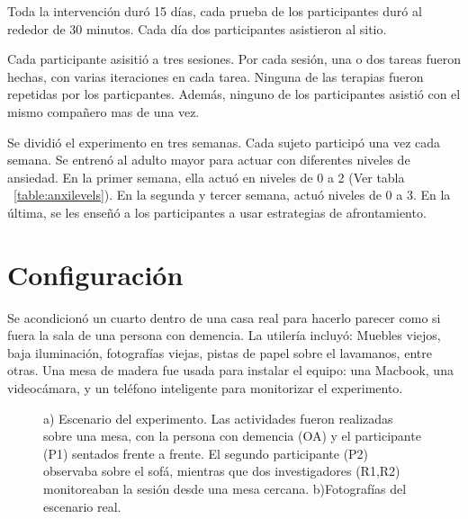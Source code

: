 Toda la intervenci\'on dur\'o 15 d\'ias, cada prueba de los participantes dur\'o al rededor de 30 minutos. Cada d\'ia dos participantes asistieron al sitio.

Cada participante asisiti\'o a tres sesiones. Por cada sesi\'on, una o dos tareas fueron hechas, con varias iteraciones en cada tarea. Ninguna de las terapias fueron repetidas por los particpantes. Adem\'as, ninguno de los participantes asisti\'o con el mismo compa\~nero mas de una vez.

Se dividi\'o el experimento en tres semanas. Cada sujeto particip\'o una vez cada semana. Se entren\'o al adulto mayor para actuar con diferentes niveles de ansiedad. En la primer semana, ella actu\'o en niveles de 0 a 2 (Ver tabla ~\ref{table:anxilevels}). En la segunda y tercer semana, actu\'o niveles de 0 a 3. En la \'ultima, se les ense\~n\'o a los participantes a usar estrategias de afrontamiento.
\section{Configuraci\'on}\label{secc:setup}
	Se acondicion\'o un cuarto dentro de una casa real para hacerlo parecer como si fuera la sala de una persona con demencia. La utiler\'ia incluy\'o: Muebles viejos, baja iluminaci\'on, fotograf\'ias viejas, pistas de papel sobre el lavamanos, entre otras. Una mesa de madera fue usada para instalar el equipo: una Macbook, una videoc\'amara, y un tel\'efono inteligente para monitorizar el experimento.
\begin{figure}[h!]
        \centering
	\caption{a) Escenario del experimento. Las actividades fueron realizadas sobre una mesa, con la persona con demencia (OA) y el participante (P1) sentados frente a frente. El segundo participante (P2) observaba sobre el sof\'a, mientras que dos investigadores (R1,R2) monitoreaban la sesi\'on desde una mesa cercana. b)Fotograf\'ias del escenario real.} \label{fig:img_exp_setup}
\end{figure}

